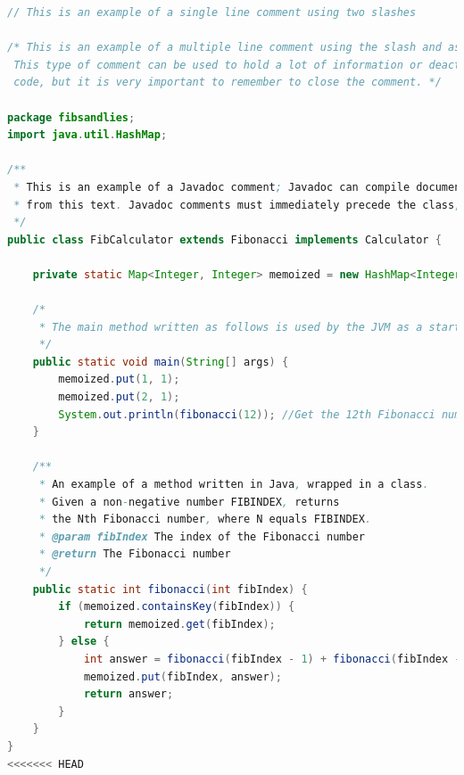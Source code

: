 \begin{lstlisting}[language=Java, caption=\selectlanguage{greek}Παράδειγμα κώδικα σε \selectlanguage{english}Java]
// This is an example of a single line comment using two slashes

/* This is an example of a multiple line comment using the slash and asterisk.
 This type of comment can be used to hold a lot of information or deactivate
 code, but it is very important to remember to close the comment. */

package fibsandlies;
import java.util.HashMap;

/**
 * This is an example of a Javadoc comment; Javadoc can compile documentation
 * from this text. Javadoc comments must immediately precede the class, method, or field being documented.
 */
public class FibCalculator extends Fibonacci implements Calculator {

    private static Map<Integer, Integer> memoized = new HashMap<Integer, Integer>();

    /*
     * The main method written as follows is used by the JVM as a starting point for the program.
     */
    public static void main(String[] args) {
        memoized.put(1, 1);
        memoized.put(2, 1);
        System.out.println(fibonacci(12)); //Get the 12th Fibonacci number and print to console
    }

    /**
     * An example of a method written in Java, wrapped in a class.
     * Given a non-negative number FIBINDEX, returns
     * the Nth Fibonacci number, where N equals FIBINDEX.
     * @param fibIndex The index of the Fibonacci number
     * @return The Fibonacci number
     */
    public static int fibonacci(int fibIndex) {
        if (memoized.containsKey(fibIndex)) {
            return memoized.get(fibIndex);
        } else {
            int answer = fibonacci(fibIndex - 1) + fibonacci(fibIndex - 2);
            memoized.put(fibIndex, answer);
            return answer;
        }
    }
}
<<<<<<< HEAD
\end{lstlisting}



